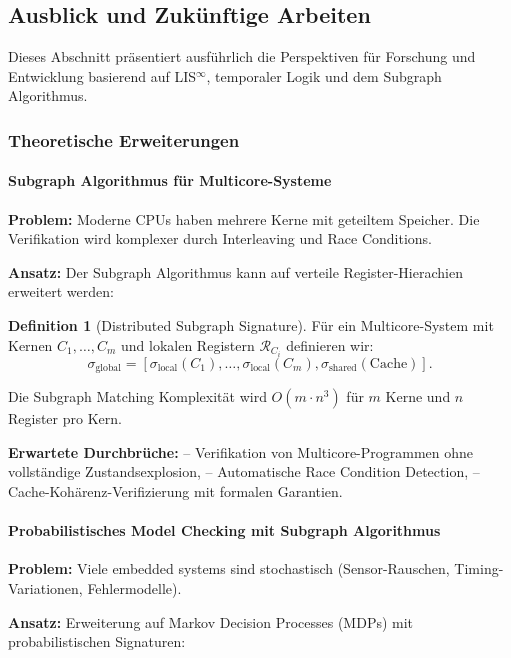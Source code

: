 \documentclass[a4paper,12pt]{article}
\theoremstyle{definition}
\newtheorem{definition}{Definition}
\begin{document}
\subsection{Ausblick und Zukünftige Arbeiten}

Dieses Abschnitt präsentiert ausführlich die Perspektiven für Forschung und Entwicklung basierend auf LIS$^{\infty}$, temporaler Logik und dem Subgraph Algorithmus.

\subsubsection{Theoretische Erweiterungen}

\paragraph{Subgraph Algorithmus für Multicore-Systeme}

\textbf{Problem:} Moderne CPUs haben mehrere Kerne mit geteiltem Speicher. Die Verifikation wird komplexer durch Interleaving und Race Conditions.

\textbf{Ansatz:} Der Subgraph Algorithmus kann auf verteile Register-Hierachien erweitert werden:

\begin{definition}[Distributed Subgraph Signature]
	Für ein Multicore-System mit Kernen $C_1, \ldots, C_m$ und lokalen Registern $\mathcal{R}_{C_i}$ definieren wir:
	\[
	\sigma_{\text{global}} = \left[\sigma_{\text{local}}(C_1), \ldots, \sigma_{\text{local}}(C_m), \sigma_{\text{shared}}(\text{Cache})\right].
	\]
	
	Die Subgraph Matching Komplexität wird $O(m \cdot n^3)$ für $m$ Kerne und $n$ Register pro Kern.
\end{definition}

\textbf{Erwartete Durchbrüche:}
-- Verifikation von Multicore-Programmen ohne vollständige Zustandsexplosion,
-- Automatische Race Condition Detection,
-- Cache-Kohärenz-Verifizierung mit formalen Garantien.

\paragraph{Probabilistisches Model Checking mit Subgraph Algorithmus}

\textbf{Problem:} Viele embedded systems sind stochastisch (Sensor-Rauschen, Timing-Variationen, Fehlermodelle).

\textbf{Ansatz:} Erweiterung auf Markov Decision Processes (MDPs) mit probabilistischen Signaturen:
\end{document}
